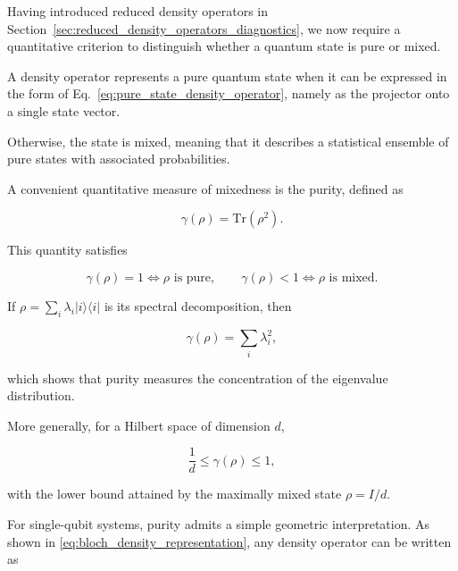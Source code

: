 Having introduced reduced density operators in Section~\ref{sec:reduced_density_operators_diagnostics}, we now require a quantitative criterion to distinguish whether a quantum state is pure or mixed.

\medskip

A density operator represents a pure quantum state when it can be expressed in the form of Eq.~\eqref{eq:pure_state_density_operator}, namely as the projector onto a single state vector.

Otherwise, the state is mixed, meaning that it describes a statistical ensemble of pure states with associated probabilities.

\medskip 

A convenient quantitative measure of mixedness is the purity, defined as

\begin{equation}
\gamma(\rho)
=
\mathrm{Tr}(\rho^2).
\label{eq:purity_definition}
\end{equation}

This quantity satisfies

\begin{equation}
\gamma(\rho)=1
\Longleftrightarrow
\rho \text{ is pure},
\qquad
\gamma(\rho)<1
\Longleftrightarrow
\rho \text{ is mixed}.
\label{eq:purity_pure_mixed_condition}
\end{equation}

\medskip

If \( \rho = \sum_i \lambda_i |i\rangle\langle i| \) is its spectral decomposition, then

\begin{equation}
\gamma(\rho)
=
\sum_i \lambda_i^2,
\label{eq:purity_spectral_decomposition}
\end{equation}

which shows that purity measures the concentration of the eigenvalue distribution.

More generally, for a Hilbert space of dimension \( d \),

\begin{equation}
\frac{1}{d}
\le
\gamma(\rho)
\le
1,
\label{eq:purity_bounds}
\end{equation}

with the lower bound attained by the maximally mixed state \( \rho = I/d \).

\medskip

For single-qubit systems, purity admits a simple geometric interpretation. As shown in \ref{eq:bloch_density_representation}, any density operator can be written as

